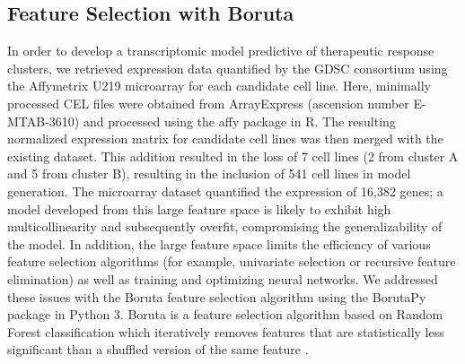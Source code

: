 \documentclass[10pt, letterpaper, twocolumn]{article}
\begin{document}
\subsection{Feature Selection with Boruta}
In order to develop a transcriptomic model predictive of therapeutic response clusters, we retrieved expression data quantified by the GDSC consortium using the Affymetrix U219 microarray for each candidate cell line. Here, minimally processed CEL files were obtained from ArrayExpress (ascension number E-MTAB-3610) and processed using the affy package \cite{affy} in R. The resulting normalized expression matrix for candidate cell lines was then merged with the existing dataset. This addition resulted in the loss of 7 cell lines (2 from cluster A and 5 from cluster B), resulting in the inclusion of 541 cell lines in model generation. The microarray dataset quantified the expression of 16,382 genes; a model developed from this large feature space is likely to exhibit high multicollinearity and subsequently overfit, compromising the generalizability of the model. In addition, the large feature space limits the efficiency of various feature selection algorithms (for example, univariate selection or recursive feature elimination) as well as training and optimizing neural networks. We addressed these issues with the Boruta feature selection algorithm using the BorutaPy package \cite{liu} in Python 3. Boruta is a feature selection algorithm based on Random Forest classification which iteratively removes features that are statistically less significant than a shuffled version of the same feature \cite{kursa}.
\end{document}

